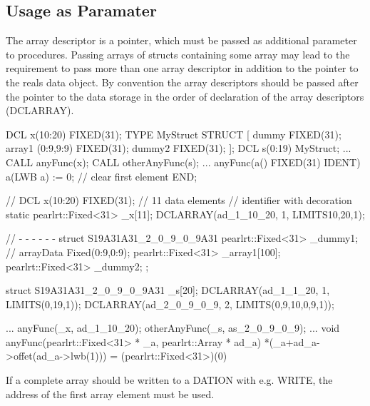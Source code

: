 \subsection{Usage as Paramater}
The array descriptor is a pointer, which must be passed as additional parameter
to procedures. 
Passing arrays of structs containing some array may lead to the requirement
to pass more than one array descriptor in addition to the pointer to the 
reals data object.
By convention the array descriptors should be passed after the pointer to the
data storage in the order of declaration of the array descriptors (DCLARRAY).

\begin{PEARLCode}
DCL x(10:20) FIXED(31); 
TYPE MyStruct STRUCT [
           dummy FIXED(31);
           array1 (0:9,9:9) FIXED(31);
           dummy2 FIXED(31);
           ];
DCL s(0:19) MyStruct;
...
CALL anyFunc(x);
CALL otherAnyFunc(s);
...
anyFunc(a() FIXED(31) IDENT) 
   a(LWB a) := 0;  // clear first element
END;
\end{PEARLCode}

\begin{CppCode}
// DCL x(10:20) FIXED(31); 
 // 11 data elements
 // identifier with decoration
static pearlrt::Fixed<31> _x[11];
DCLARRAY(ad_1_10_20, 1, LIMITS{{10,20,1}});

// - - - - - - 
   struct S19A31A31_2_0_9_0_9A31 {
      pearlrt::Fixed<31> _dummy1;
                       // arrayData Fixed(0:9,0:9);
      pearlrt::Fixed<31> _array1[100]; 
      pearlrt::Fixed<31> _dummy2;
   };

   struct S19A31A31_2_0_9_0_9A31  _s[20]; 
   DCLARRAY(ad_1_1_20, 1, LIMITS({{0,19,1}}));
   DCLARRAY(ad_2_0_9_0_9, 2, LIMITS({{0,9,10},{0,9,1}}));

...
   anyFunc(_x, ad_1_10_20);
   otherAnyFunc(_s, as_2_0_9_0_9);
...
void anyFunc(pearlrt::Fixed<31> * _a, pearlrt::Array * ad_a) {
  *(_a+ad_a->offet(ad_a->lwb(1))) = (pearlrt::Fixed<31>)(0)
}
\end{CppCode}

If a complete array should be written to a DATION with e.g. WRITE,
the address of the first array element must be used.


